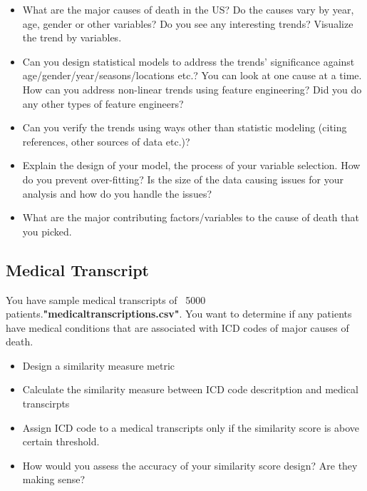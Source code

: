 \documentclass{article}
\begin{document}
\begin{itemize}

\item What are the major causes of death in the US? Do the causes vary by year, age, gender or other variables? Do you see any interesting trends? Visualize the trend by variables. 

\item Can you design statistical models to address the trends' significance against age/gender/year/seasons/locations etc.? You can look at one cause at a time. How can you address non-linear trends using feature engineering? Did you do any other types of feature engineers? 

\item Can you verify the trends using ways other than statistic modeling (citing references, other sources of data etc.)?

\item Explain the design of your model, the process of your variable selection. How do you prevent over-fitting? Is the size of the data causing issues for your analysis and how do you handle the issues?

\item What are the major contributing factors/variables to the cause of death that you picked.

\end{itemize}

\subsection{Medical Transcript}
You have sample medical transcripts of ~5000 patients.\textbf{"medicaltranscriptions.csv"}. You want to determine if any patients have medical conditions that are associated with ICD codes of major causes of death.
\begin{itemize}
\item Design a similarity measure metric
\item Calculate the similarity measure between ICD code descritption and medical transcirpts
\item Assign ICD code to a medical transcripts only if the similarity score is above certain threshold.
\item How would you assess the accuracy of your similarity score design? Are they making sense?
\end{itemize}
\end{document}
